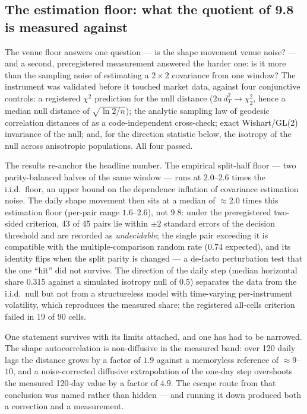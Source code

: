 \documentclass[11pt,a4paper]{article}
\numberwithin{equation}{section}
\begin{document}
\subsection{The estimation floor: what the quotient of 9.8 is
measured against}

The venue floor answers one question --- is the shape movement
venue noise? --- and a second, preregistered measurement answered
the harder one: is it more than the sampling noise of estimating a
$2\times2$ covariance from one window? The instrument was
validated before it touched market data, against four conjunctive
controls: a registered $\chi^2$ prediction for the null distance
($2n\,d_T^2\to\chi^2_2$, hence a median null distance of
$\sqrt{\ln 2/n}$); the analytic sampling law of geodesic
correlation distances of \cite{Kuketayev2026} as a
code-independent cross-check; exact Wishart/GL(2) invariance of
the null; and, for the direction statistic below, the isotropy of
the null across anisotropic populations. All four passed.

The results re-anchor the headline number. The empirical
split-half floor --- two parity-balanced halves of the same window
--- runs at $2.0$--$2.6$ times the i.i.d.\ floor, an upper bound
on the dependence inflation of covariance estimation noise. The
daily shape movement then sits at a median of $\approx2.0$ times
this estimation floor (per-pair range $1.6$--$2.6$), not $9.8$:
under the preregistered two-sided criterion, 43 of 45 pairs lie
within $\pm2$ standard errors of the decision threshold and are
recorded as \emph{undecidable}; the single pair exceeding it is
compatible with the multiple-comparison random rate ($0.74$
expected), and its identity flips when the split parity is changed
--- a de-facto perturbation test that the one ``hit'' did not
survive. The direction of the daily step (median horizontal share
$0.315$ against a simulated isotropy null of $0.5$) separates the
data from the i.i.d.\ null but not from a structureless model with
time-varying per-instrument volatility, which reproduces the
measured share; the registered all-cells criterion failed in 19 of
90 cells.

One statement survives with its limits attached, and one has had
to be narrowed. The shape autocorrelation is non-diffusive in the
measured band: over 120 daily lags the distance grows by a factor
of $1.9$ against a memoryless reference of $\approx9$--$10$, and a
noise-corrected diffusive extrapolation of the one-day step
overshoots the measured 120-day value by a factor of $4.9$. The
escape route from that conclusion was named rather than hidden ---
and running it down produced both a correction and a measurement.
\end{document}
